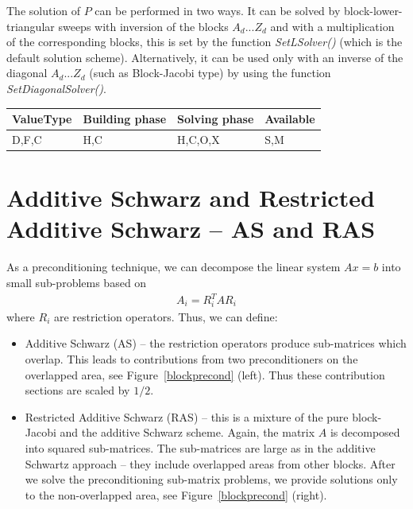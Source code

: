 The solution of $P$ can be performed in two ways. It can be solved by block-lower-triangular sweeps with inversion of the blocks $A_d$...$Z_d$ and with a multiplication of the corresponding blocks, this is set by the function \emph{SetLSolver()} (which is the default solution scheme). Alternatively, it can be used only with an inverse of the diagonal $A_d$...$Z_d$ (such as Block-Jacobi type) by using the function \emph{SetDiagonalSolver()}. 

\begin{table}[H]
\begin{tabular}{l|l|l|l}
\multicolumn{1}{c|}{ValueType} & Building phase & Solving phase & Available \\ \hline
D,F,C                          & H,C            & H,C,O,X       & S,M      
\end{tabular}
\end{table}




\section{Additive Schwarz and Restricted Additive Schwarz -- AS and RAS}

As a preconditioning technique, we can decompose the linear system $Ax=b$ into small sub-problems based on
%
\begin{eqnarray}
A_i=R_i^T A R_i
\end{eqnarray}
% 
where $R_i$ are restriction operators. Thus, we can define:

\begin{itemize}
\itemsep0em

\item{Additive Schwarz (AS)} -- the restriction operators produce sub-matrices which overlap. This leads to contributions from two preconditioners on the overlapped area, see Figure~\ref{blockprecond} (left). Thus these contribution sections are scaled by $1/2$.

\item{Restricted Additive Schwarz (RAS)} -- this is a mixture of the pure block-Jacobi and the additive Schwarz scheme. Again, the matrix $A$ is decomposed into squared sub-matrices. The sub-matrices are large as in the additive Schwartz approach -- they include overlapped areas from other blocks. After we solve the preconditioning sub-matrix problems, we provide solutions only to the non-overlapped area, see Figure~\ref{blockprecond} (right).
\end{itemize}

